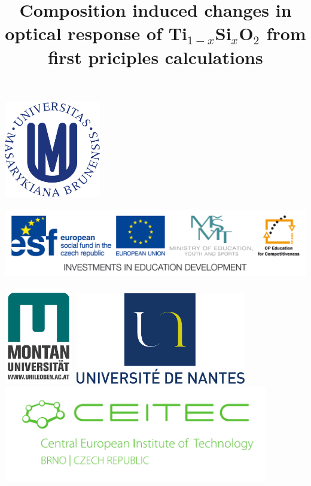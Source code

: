 \documentclass[blues]{poster}
\begin{document}
\title{Composition induced changes in optical response of Ti$_{1-x}$Si$_x$O$_2$ from first priciples calculations}
\affiliation
  {\hsize=18cm
   \hbox{\includegraphics[height=4.2cm]{MU-blue.pdf} \quad
	\includegraphics[height=3.8cm]{OPVK_hor_zakladni_logolink_RGB_eng.jpg}}
   \hbox{\includegraphics[height=4.2cm]{MUL.jpeg}\quad
		 \includegraphics[height=4.0cm]{University_of_Nantes.pdf}
         \includegraphics[height=4.2cm]{CEITEC.pdf}}
	}
\end{document}
